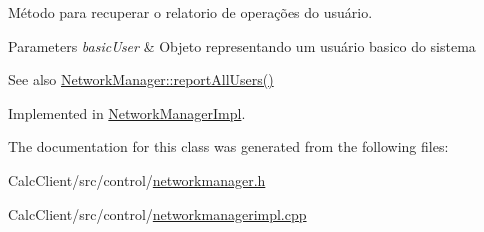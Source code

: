 Método para recuperar o relatorio de operações do usuário. 


\begin{DoxyParams}{Parameters}
{\em basic\+User} & Objeto representando um usuário basico do sistema \\
\hline
\end{DoxyParams}
\begin{DoxySeeAlso}{See also}
\hyperlink{classNetworkManager_adc90f12e3f926a79382aefbceb3aecfc}{Network\+Manager\+::report\+All\+Users()} 
\end{DoxySeeAlso}


Implemented in \hyperlink{classNetworkManagerImpl_afa21ec0a3c38b1b1a48e5c58249c6374}{Network\+Manager\+Impl}.



The documentation for this class was generated from the following files\+:\begin{DoxyCompactItemize}
\item 
Calc\+Client/src/control/\hyperlink{networkmanager_8h}{networkmanager.\+h}\item 
Calc\+Client/src/control/\hyperlink{networkmanagerimpl_8cpp}{networkmanagerimpl.\+cpp}\end{DoxyCompactItemize}
